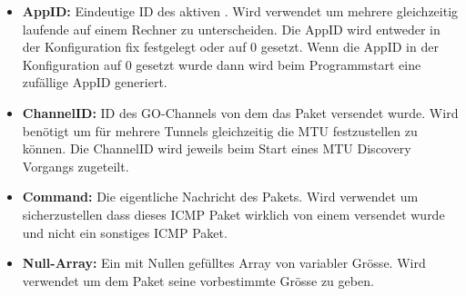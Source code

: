 \begin{itemize}
  \item \textbf{AppID:} Eindeutige ID des aktiven \tool{}. Wird verwendet um mehrere gleichzeitig laufende \tool{} auf einem Rechner zu unterscheiden. Die AppID wird entweder in der Konfiguration fix festgelegt oder auf 0 gesetzt. Wenn die AppID in der Konfiguration auf 0 gesetzt wurde dann wird beim Programmstart eine zufällige AppID generiert.
  \item \textbf{ChannelID:} ID des GO-Channels von dem das Paket versendet wurde. Wird benötigt um für mehrere Tunnels gleichzeitig die \acs{MTU} festzustellen zu können. Die ChannelID wird jeweils beim Start eines \acs{MTU} Discovery Vorgangs zugeteilt.
  \item \textbf{Command:} Die eigentliche Nachricht des Pakets. Wird verwendet um sicherzustellen dass dieses \acs{ICMP} Paket wirklich von einem \tool{} versendet wurde und nicht ein sonstiges \acs{ICMP} Paket.
  \item \textbf{Null-Array:} Ein mit Nullen gefülltes Array von variabler Grösse. Wird verwendet um dem Paket seine vorbestimmte Grösse zu geben.
\end{itemize}

